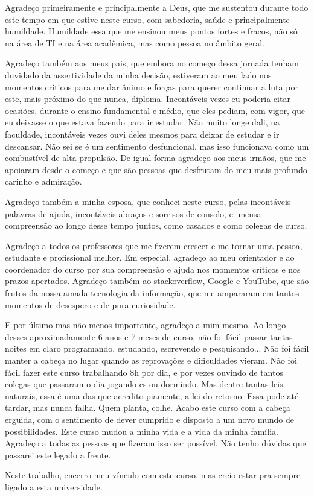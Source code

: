 \begin{agradecimentos}
Agradeço primeiramente e principalmente a Deus, que me sustentou durante todo este tempo em que estive neste curso, com sabedoria, saúde e principalmente humildade. Humildade essa que me ensinou meus pontos fortes e fracos, não só na área de TI e na área acadêmica, mas como pessoa no âmbito geral. 

Agradeço também aos meus pais, que embora no começo dessa jornada tenham duvidado da assertividade da minha decisão, estiveram ao meu lado nos momentos críticos para me dar ânimo e forças para querer continuar a luta por este, mais próximo do que nunca, diploma. Incontáveis vezes eu poderia citar ocasiões, durante o ensino fundamental e médio, que eles pediam, com vigor,  que eu deixasse o que estava fazendo para ir estudar. Não muito longe dali, na faculdade, incontáveis vezes ouvi deles mesmos para deixar de estudar e ir descansar. Não sei se é um sentimento desfuncional, mas isso funcionava como um combustível de alta propulsão. De igual forma agradeço aos meus irmãos, que me apoiaram desde o começo e que são pessoas que desfrutam do meu mais profundo carinho e admiração.

Agradeço também a minha esposa, que conheci neste curso, pelas incontáveis palavras de ajuda, incontáveis abraços e sorrisos de consolo, e imensa compreensão ao longo desse tempo juntos, como casados e como colegas de curso.

Agradeço a todos os professores que me fizerem crescer e me tornar uma pessoa, estudante e profissional melhor. Em especial, agradeço ao meu orientador e ao coordenador do curso por sua compreensão e ajuda nos momentos críticos e nos prazos apertados. Agradeço também ao stackoverflow, Google e YouTube, que são frutos da nossa amada tecnologia da informação, que me ampararam em tantos momentos de desespero e de pura curiosidade.

E por último mas não menos importante, agradeço a mim mesmo. Ao longo desses aproximadamente 6 anos e 7 meses de curso, não foi fácil passar tantas noites em claro programando, estudando, escrevendo e pesquisando... Não foi fácil manter a cabeça no lugar quando as reprovações e dificuldades vieram. Não foi fácil fazer este curso trabalhando 8h por dia, e por vezes ouvindo de tantos colegas que passaram o dia jogando cs ou dormindo. Mas dentre tantas leis naturais, essa é uma das que acredito piamente, a lei do retorno. Essa pode até tardar, mas nunca falha. Quem planta, colhe. Acabo este curso com a cabeça erguida, com o sentimento de dever cumprido e disposto a um novo mundo de possibilidades. Este curso mudou a minha vida e a vida da minha família. Agradeço a todas as pessoas que fizeram isso ser possível. Não tenho dúvidas que passarei este legado a frente.

Neste trabalho, encerro meu vínculo com este curso, mas creio estar pra sempre ligado a esta universidade. 
\end{agradecimentos}
